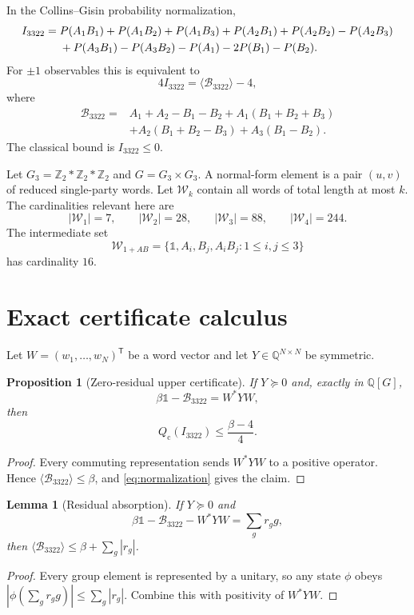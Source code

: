 \documentclass[11pt]{article}
\newtheorem{proposition}[theorem]{Proposition}
\newtheorem{lemma}[theorem]{Lemma}
\newcommand{\1}{\mathbb{1}}
\newcommand{\Bop}{\mathcal{B}_{3322}}
\newcommand{\W}{\mathcal{W}}
\newcommand{\Qc}{Q_{\mathrm c}}
\newcommand{\Q}{\mathbb{Q}}
\begin{document}
In the Collins--Gisin probability normalization,
\begin{align}
I_{3322}={}&P(A_1B_1)+P(A_1B_2)+P(A_1B_3)+P(A_2B_1)+P(A_2B_2)-P(A_2B_3)\notag\\
&+P(A_3B_1)-P(A_3B_2)-P(A_1)-2P(B_1)-P(B_2).\label{eq:probI}
\end{align}
For $\pm1$ observables this is equivalent to
\begin{equation}\label{eq:normalization}
4I_{3322}=\langle\Bop\rangle-4,
\end{equation}
where
\begin{align}\label{eq:bell}
\Bop={}&A_1+A_2-B_1-B_2+A_1(B_1+B_2+B_3)\nonumber\\
&+A_2(B_1+B_2-B_3)+A_3(B_1-B_2).
\end{align}
The classical bound is $I_{3322}\le0$.

Let $G_3=\mathbb Z_2*\mathbb Z_2*\mathbb Z_2$ and $G=G_3\times G_3$.  A normal-form element is a pair $(u,v)$ of reduced single-party words.  Let $\W_k$ contain all words of total length at most $k$.  The cardinalities relevant here are
\[
|\W_1|=7,\qquad |\W_2|=28,\qquad |\W_3|=88,\qquad |\W_4|=244.
\]
The intermediate set
\[
\W_{1+AB}=\{\1,A_i,B_j,A_iB_j:1\le i,j\le3\}
\]
has cardinality $16$.

\section{Exact certificate calculus}\label{sec:calculus}
Let $W=(w_1,\ldots,w_N)^{\mathsf T}$ be a word vector and let $Y\in\Q^{N\times N}$ be symmetric.

\begin{proposition}[Zero-residual upper certificate]\label{prop:zero}
If $Y\succeq0$ and, exactly in $\Q[G]$,
\begin{equation}\label{eq:zero}
\beta\1-\Bop=W^*YW,
\end{equation}
then
\[
\Qc(I_{3322})\le\frac{\beta-4}{4}.
\]
\end{proposition}
\begin{proof}
Every commuting representation sends $W^*YW$ to a positive operator.  Hence $\langle\Bop\rangle\le\beta$, and \eqref{eq:normalization} gives the claim.
\end{proof}

\begin{lemma}[Residual absorption]\label{lem:absorb}
If $Y\succeq0$ and
\[
\beta\1-\Bop-W^*YW=\sum_g r_gg,
\]
then $\langle\Bop\rangle\le\beta+\sum_g|r_g|$.
\end{lemma}
\begin{proof}
Every group element is represented by a unitary, so any state $\phi$ obeys $|\phi(\sum_g r_gg)|\le\sum_g|r_g|$.  Combine this with positivity of $W^*YW$.
\end{proof}
\end{document}
